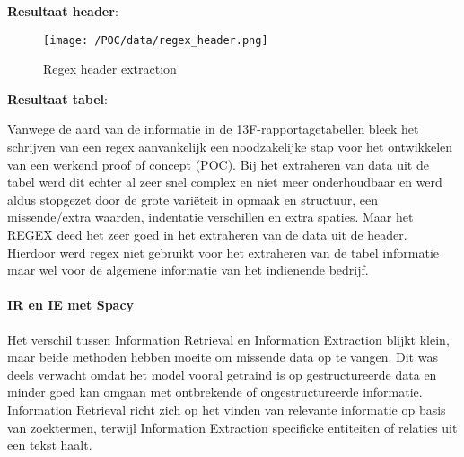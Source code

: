 \textbf{Resultaat header}: 
\begin{figure}[H]
    \centering        
    \texttt{[image: /POC/data/regex\_header.png]}
    \caption{Regex header extraction}
    \label{fig:regex header}
\end{figure}
\textbf{Resultaat tabel}: 

Vanwege de aard van de informatie in de 13F-rapportagetabellen bleek het schrijven van een regex aanvankelijk een noodzakelijke stap voor het ontwikkelen van een werkend proof of concept (POC). Bij het extraheren van data uit de tabel werd dit echter al zeer snel complex en niet meer onderhoudbaar en werd aldus stopgezet door de grote variëteit in opmaak en structuur, een missende/extra waarden, indentatie verschillen en extra spaties. Maar het REGEX deed het zeer goed in het extraheren van de data uit de header. Hierdoor werd regex niet gebruikt voor het extraheren van de tabel informatie maar wel voor de algemene informatie van het indienende bedrijf.

%

\paragraph{IR en IE met Spacy}
Het verschil tussen Information Retrieval en Information Extraction blijkt klein, maar beide methoden hebben moeite om missende data op te vangen. Dit was deels verwacht omdat het model vooral getraind is op gestructureerde data en minder goed kan omgaan met ontbrekende of ongestructureerde informatie. Information Retrieval richt zich op het vinden van relevante informatie op basis van zoektermen, terwijl Information Extraction specifieke entiteiten of relaties uit een tekst haalt. 


